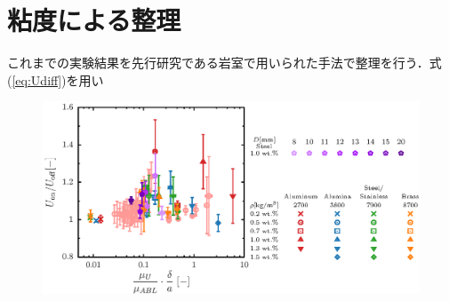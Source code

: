 \section{粘度による整理}

これまでの実験結果を先行研究である岩室\cite{ref:8}で用いられた手法で整理を行う．式(\ref{eq:Udiff})を用い

\begin{figure}[ht]
    \centering
    \includegraphics[width=1.0\textwidth]{5-Results/viscosity.eps}
    \caption{}
    \label{fig:viscosity}
\end{figure}
